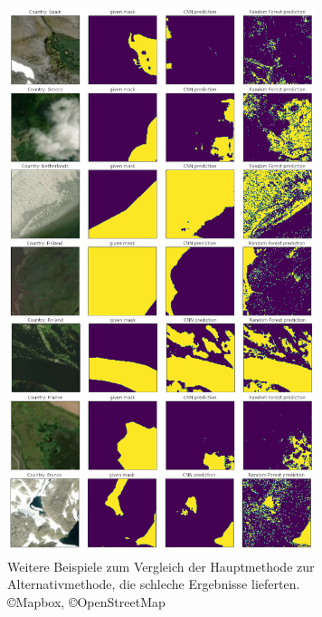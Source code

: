 \begin{figure}
    \centering
    \includegraphics[width=0.8\textwidth]{images/bsp_bad.png}
    \caption{Weitere Beispiele zum Vergleich der Hauptmethode zur Alternativmethode, die schleche Ergebnisse lieferten.\\ \copyright Mapbox, \copyright OpenStreetMap}
    \label{fig:bsp_bad}
\end{figure}
